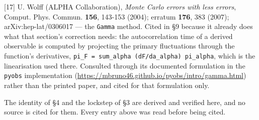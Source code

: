 \documentclass[10pt,letterpaper,twocolumn]{article}
\begin{document}
{[}17{]} U. Wolff (ALPHA Collaboration), \emph{Monte Carlo errors with less errors}, Comput. Phys. Commun.
\textbf{156}, 143-153 (2004); erratum \textbf{176}, 383 (2007); arXiv:hep-lat/0306017 --- the \texttt{Gamma} method.
Cited in §9 because it already does what that section's correction needs: the autocorrelation time
of a derived observable is computed by projecting the primary fluctuations through the function's
derivatives, \texttt{pi\_\allowbreak{}F\ =\allowbreak{}\ sum\_\allowbreak{}alpha\ (\allowbreak{}dF/\allowbreak{}da\_\allowbreak{}alpha)\allowbreak{}\ pi\_\allowbreak{}alpha}, which is the linearisation used there.
Consulted through its documented formulation in the \texttt{pyobs} implementation
(\href{https://mbruno46.github.io/pyobs/intro/gamma.html}{https:\allowbreak{}/\allowbreak{}/\allowbreak{}mbruno46\allowbreak{}.\allowbreak{}github.\allowbreak{}io/\allowbreak{}pyobs/\allowbreak{}intro/\allowbreak{}gamma.\allowbreak{}html}) rather than the printed paper, and cited
for that formulation only.

The identity of §4 and the lockstep of §3 are derived and verified here, and no source is cited
for them. Every entry above was read before being cited.
\end{document}
